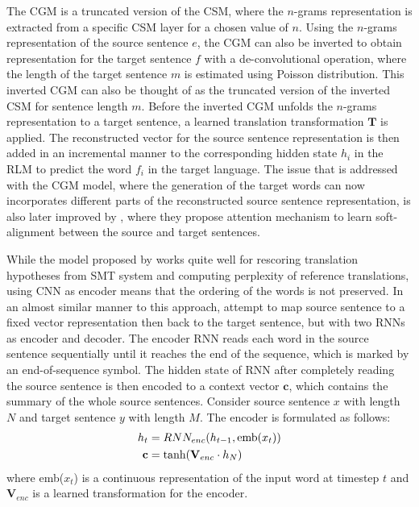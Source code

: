 \documentclass[12pt]{extarticle}
\begin{document}
The CGM is a truncated version of the CSM, where the $n$-grams representation is extracted from a specific CSM layer for a chosen value of $n$. Using the $n$-grams representation of the source sentence $e$, the CGM can also be inverted to obtain representation for the target sentence $f$ with a de-convolutional operation, where the length of the target sentence $m$ is estimated using Poisson distribution. This inverted CGM can also be thought of as the truncated version of the inverted CSM for sentence length $m$. Before the inverted CGM unfolds the $n$-grams representation to a target sentence, a learned translation transformation $\textbf{T}$ is applied. The reconstructed vector for the source sentence representation is then added in an incremental manner to the corresponding hidden state $h_{i}$ in the RLM to predict the word $f_{i}$ in the target language. The issue that is addressed with the CGM model, where the generation of the target words can now incorporates different parts of the reconstructed source sentence representation, is also later improved by \citep{DBLP:journals/corr/BahdanauCB14}, where they propose attention mechanism to learn soft-alignment between the source and target sentences.

\newpage

While the model proposed by \citep{kalchbrenner-blunsom-2013-recurrent-continuous} works quite well for rescoring translation hypotheses from SMT system and computing perplexity of reference translations, using CNN as encoder means that the ordering of the words is not preserved. In an almost similar manner to this approach, \citep{cho-etal-2014-learning} attempt to map source sentence to a fixed vector representation then back to the target sentence, but with two RNNs as encoder and decoder. The encoder RNN reads each word in the source sentence sequentially until it reaches the end of the sequence, which is marked by an end-of-sequence symbol. The hidden state of RNN after completely reading the source sentence is then encoded to a context vector $\textbf{c}$, which contains the summary of the whole source sentences. Consider source sentence $x$ with length $N$ and target sentence $y$ with length $M$. The encoder is formulated as follows:
\begin{align}
h_{t} &= RNN_{enc}(h_{t-1}, \textnormal{emb}(x_{t})) \\
\textbf{c} &= \textnormal{tanh}(\textbf{V}_{enc} \cdot h_{N})
\end{align}
where emb($x_{t}$) is a continuous representation of the input word at timestep $t$ and $\textbf{V}_{enc}$ is a learned transformation for the encoder. 
\end{document}
